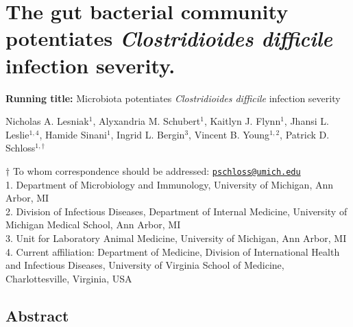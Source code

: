 \documentclass[
  12pt,
]{article}
\author{}
\date{\vspace{-2.5em}}
\begin{document}
\linenumbers
\doublespacing

\hypertarget{the-gut-bacterial-community-potentiates-clostridioides-difficile-infection-severity.}{%
\section{\texorpdfstring{The gut bacterial community potentiates
\emph{Clostridioides difficile} infection
severity.}{The gut bacterial community potentiates Clostridioides difficile infection severity.}}\label{the-gut-bacterial-community-potentiates-clostridioides-difficile-infection-severity.}}

\vspace{30mm}

\textbf{Running title:} Microbiota potentiates \emph{Clostridioides
difficile} infection severity

\vspace{20mm}

Nicholas A. Lesniak\(^1\), Alyxandria M. Schubert\(^1\), Kaitlyn J.
Flynn\(^1\), Jhansi L. Leslie\(^{1,4}\), Hamide Sinani\(^1\), Ingrid L.
Bergin\(^3\), Vincent B. Young\(^{1,2}\), Patrick D.
Schloss\(^{1,\dagger}\)

\vspace{30mm}

\(\dagger\) To whom correspondence should be addressed:
\href{mailto:pschloss@umich.edu}{\nolinkurl{pschloss@umich.edu}}\\
1. Department of Microbiology and Immunology, University of Michigan,
Ann Arbor, MI\\
2. Division of Infectious Diseases, Department of Internal Medicine,
University of Michigan Medical School, Ann Arbor, MI\\
3. Unit for Laboratory Animal Medicine, University of Michigan, Ann
Arbor, MI\\
4. Current affiliation: Department of Medicine, Division of
International Health and Infectious Diseases, University of Virginia
School of Medicine, Charlottesville, Virginia, USA

\newpage

\hypertarget{abstract}{%
\subsection{Abstract}\label{abstract}}
\end{document}
